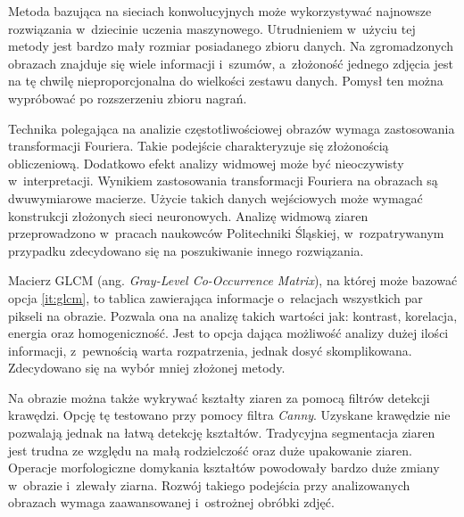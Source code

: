 Metoda bazująca na sieciach konwolucyjnych może wykorzystywać najnowsze
rozwiązania w~dziecinie uczenia maszynowego.
Utrudnieniem w~użyciu tej metody jest bardzo mały rozmiar posiadanego
zbioru danych.
Na zgromadzonych obrazach znajduje się wiele informacji i~szumów,
a~złożoność jednego zdjęcia jest na tę chwilę nieproporcjonalna do wielkości
zestawu danych.
Pomysł ten można wypróbować po rozszerzeniu zbioru nagrań.

Technika polegająca na analizie częstotliwościowej obrazów wymaga zastosowania
transformacji Fouriera.
Takie podejście charakteryzuje się złożonością obliczeniową.
Dodatkowo efekt analizy widmowej może być nieoczywisty w~interpretacji.
Wynikiem zastosowania transformacji Fouriera na obrazach są dwuwymiarowe
macierze.
Użycie takich danych wejściowych może wymagać konstrukcji złożonych sieci
neuronowych.
Analizę widmową ziaren przeprowadzono w~pracach naukowców Politechniki
Śląskiej, w~rozpatrywanym przypadku zdecydowano się na poszukiwanie
innego rozwiązania.

Macierz GLCM (ang. \textit{Gray-Level Co-Occurrence Matrix}), na której może
bazować opcja \ref{it:glcm}, to tablica zawierająca informacje o~relacjach
wszystkich par pikseli na obrazie.
Pozwala ona na analizę takich wartości jak: kontrast, korelacja, energia
oraz homogeniczność.
Jest to opcja dająca możliwość analizy dużej ilości informacji, z~pewnością
warta rozpatrzenia, jednak dosyć skomplikowana.
Zdecydowano się na wybór mniej złożonej metody.

Na obrazie można także wykrywać kształty ziaren za pomocą filtrów detekcji
krawędzi.
Opcję tę testowano przy pomocy filtra \emph{Canny}.
Uzyskane krawędzie nie pozwalają jednak na łatwą detekcję kształtów.
Tradycyjna segmentacja ziaren jest trudna ze względu na małą rodzielczość
oraz duże upakowanie ziaren.
Operacje morfologiczne domykania kształtów powodowały bardzo duże zmiany
w~obrazie i~zlewały ziarna.
Rozwój takiego podejścia przy analizowanych obrazach wymaga zaawansowanej
i~ostrożnej obróbki zdjęć.

